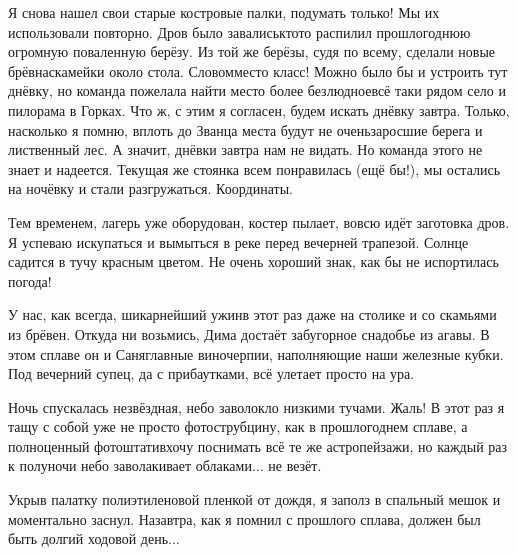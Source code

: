 Я снова нашел свои старые костровые палки, подумать только! Мы их использовали повторно. Дров было завались\mdash кто\sdash то распилил прошлогоднюю огромную поваленную берёзу. Из той же берёзы, судя по всему, сделали новые брёвна\sdash скамейки около стола. Словом\mdash место класс! Можно было бы и устроить тут днёвку, но команда пожелала найти место более безлюдное\mdash всё таки рядом село и пилорама в Горках. Что ж, с этим я согласен, будем искать днёвку завтра. Только, насколько я помню, вплоть до Званца места будут не очень\mdash заросшие берега и лиственный лес. А значит, днёвки завтра нам не видать. Но команда этого не знает и надеется. Текущая же стоянка всем понравилась (ещё бы!), мы остались на ночёвку и стали разгружаться. Координаты\mdash \CoordsChagodoschaMegrino.

Тем временем, лагерь уже оборудован, костер пылает, вовсю идёт заготовка дров. Я успеваю искупаться и вымыться в реке перед вечерней трапезой. Солнце садится в тучу красным цветом. Не очень хороший знак, как бы не испортилась погода!  

У нас, как всегда, шикарнейший ужин\mdash в этот раз даже на столике и со скамьями из брёвен. Откуда ни возьмись, Дима достаёт забугорное снадобье из агавы. В этом сплаве он и Саня\mdash главные виночерпии, наполняющие наши железные кубки. Под вечерний супец, да с прибаутками, всё улетает просто на ура. 

Ночь спускалась незвёздная, небо заволокло низкими тучами. Жаль! В этот раз я тащу с собой уже не просто фотострубцину, как в прошлогоднем сплаве, а полноценный фотоштатив\mdash хочу поснимать всё те же астропейзажи, но каждый раз к полуночи небо заволакивает облаками$\ldots$ не везёт.

Укрыв палатку полиэтиленовой пленкой от дождя, я заполз в спальный мешок и моментально заснул. Назавтра, как я помнил с прошлого сплава, должен был быть долгий ходовой день$\ldots$ 

\begin{center}
\end{center}
